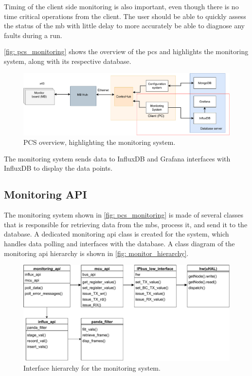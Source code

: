 \documentclass[main.tex]{subfiles}
\begin{document}
 Timing of the client side monitoring is also important, even though there is no time critical operations from the client. The user should be able to quickly assess the status of the \gls{mb} with little delay to more accurately be able to diagnose any faults during a run.
 
 \autoref{fig: pcs_monitoring} shows the overview of the \gls{pcs} and highlights the monitoring system, along with its respective database.
 
 \begin{figure}[!htpb]
    \centering
    \includegraphics[width=17cm, scale=1.5]{images/PCS overview_monitor.pdf}
    \caption{PCS overview, highlighting the monitoring system.}
    \label{fig: pcs_monitoring}
\end{figure}
\FloatBarrier
 
 The monitoring system sends data to InfluxDB and Grafana interfaces with InfluxDB to display the data points. 



\subsection{Monitoring API}
The monitoring system shown in \autoref{fig: pcs_monitoring} is made of several classes that is responsible for retrieving data from the \gls{mb}s, process it, and send it to the database. A dedicated monitoring \gls{api} class is created for the system, which handles data polling and interfaces with the database. A class diagram of the monitoring \gls{api} hierarchy is shown in \autoref{fig: monitor_hierarchy}.

 \begin{figure}[!htpb]
    \centering
    \includegraphics[width=17cm, scale=1.5]{images/monitor_interface_hierarchy.pdf}
    \caption{Interface hierarchy for the monitoring system.}
    \label{fig: monitor_hierarchy}
\end{figure}
\FloatBarrier
\end{document}
